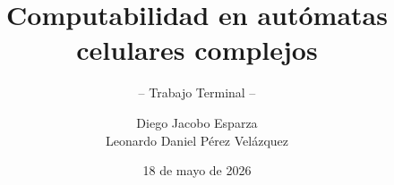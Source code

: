 \documentclass[graybox,envcountchap]{svmono}
\date{18 de mayo de 2026}
\begin{document}
\author{Diego Jacobo Esparza\\Leonardo Daniel Pérez Velázquez}
\title{Computabilidad en autómatas celulares complejos}
\subtitle{-- Trabajo Terminal --}
\maketitle

\frontmatter%


%


%
%

\tableofcontents
\listoffigures
\listoftables




\mainmatter%









%
%
%
%

\backmatter%
%


\end{document}
